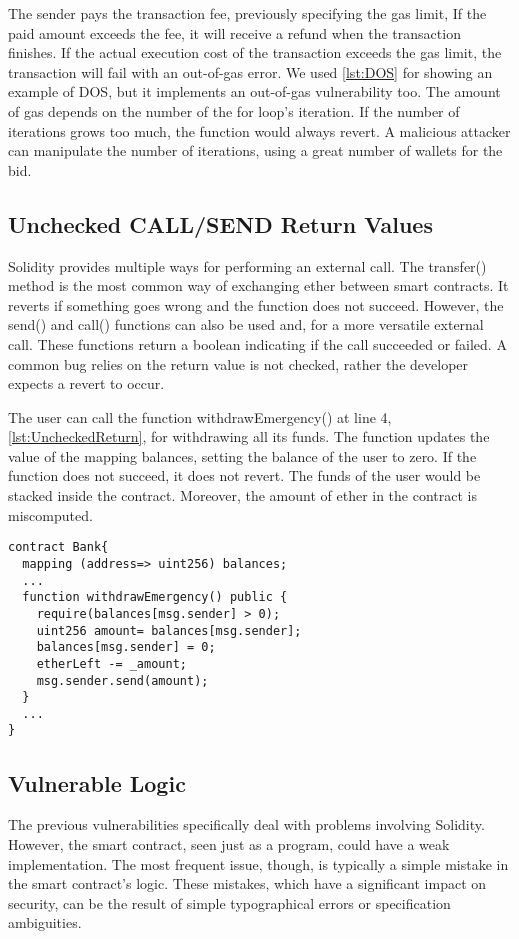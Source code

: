 \documentclass[a4paper,sigconf, language=french,
language=german, language=spanish, language=english]{acmart}
\begin{document}
The sender pays the transaction fee, previously specifying the gas limit, If the paid amount exceeds the fee, it will receive a refund when the transaction finishes. 
If the actual execution cost of the transaction exceeds the gas limit, the transaction will fail with an out-of-gas error. 
We used \autoref{lst:DOS} for showing an example of DOS, but it implements an out-of-gas vulnerability too. 
The amount of gas depends on the number of the for loop's iteration. If the number of iterations grows too much, the function would always revert. A malicious attacker can 
manipulate the number of iterations, using a great number of wallets for the bid.

\subsection{Unchecked CALL/SEND Return Values} 
Solidity provides multiple ways for performing an external call. 
The transfer() method is the most common way of exchanging ether between smart contracts. 
It reverts if something goes wrong and the function does not succeed. However, the send() and call() functions can also be used and, for a more versatile external call. 
These functions return a boolean indicating if the call succeeded or failed.  A common bug relies on the return value is not checked, rather the developer expects a revert to occur. 

The user can call the function withdrawEmergency()  at line 4, \autoref{lst:UncheckedReturn}, for withdrawing all its funds. The function updates the value of the mapping balances, setting 
the balance of the user to zero. If the function does not succeed, it does not revert. 
The funds of the user would be stacked inside the contract. Moreover, the amount of ether in the contract is miscomputed.

\begin{lstlisting}[language=Solidity,caption={Unchecked CALL/SEND Return Values},label={lst:UncheckedReturn}]
contract Bank{
  mapping (address=> uint256) balances;
  ... 
  function withdrawEmergency() public {
    require(balances[msg.sender] > 0);
    uint256 amount= balances[msg.sender];
    balances[msg.sender] = 0;
    etherLeft -= _amount;
    msg.sender.send(amount);
  }
  ...
}

\end{lstlisting}

\subsection{Vulnerable Logic}
The previous vulnerabilities specifically deal with problems involving Solidity. However, the smart contract, seen just as a 
program, could have a weak implementation.
The most frequent issue, though, is typically a simple mistake in the smart contract's logic.
These mistakes, which have a significant impact on security, can be the result of simple typographical errors or specification ambiguities. 
\end{document}
